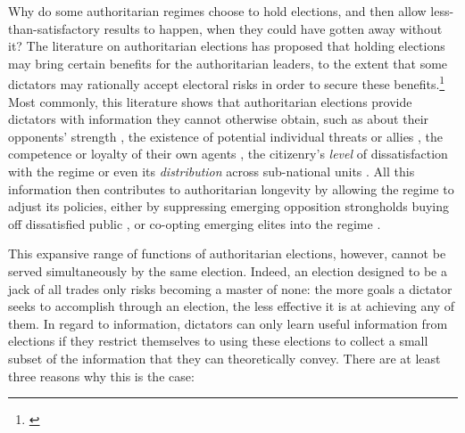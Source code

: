 \documentclass[12pt]{article}
\newcommand{\1}{\mathbbm{1}}
\begin{document}
Why do some authoritarian regimes choose to hold elections, and then allow less-than-satisfactory results to happen, when they could have gotten away without it? The literature on authoritarian elections has proposed that holding elections may bring certain benefits for the authoritarian leaders, to the extent that some dictators may rationally accept electoral risks in order to secure these benefits.\footnote{\cite[See][for some of the most seminal works in this literature]{Geddes2005, LustOkar2006, AR2005, Magaloni2006, Blaydes2008, Miller2015, Cox2009}} Most commonly, this literature shows that authoritarian elections provide dictators with information they cannot otherwise obtain, such as about their opponents' strength \citep{Geddes2005}, the existence of potential individual threats or allies \citep{LustOkar2005}, the competence or loyalty of their own agents \citep{Magaloni2006, Blaydes2008, Myagkov2009, RundlettSvolik2016}, the citizenry's \textit{level} of dissatisfaction with the regime \citep{Miller2015} or even its \textit{distribution} across sub-national units \citep{Magaloni2006, Blaydes2008, Reed2001}. All this information then contributes to authoritarian longevity by allowing the regime to adjust its policies, either by suppressing emerging opposition strongholds \citep{Magaloni2006, Blaydes2008} buying off dissatisfied public \citep{Reed2001, Miller2015, Magaloni2006}, or co-opting emerging elites into the regime \citep{LustOkar2005}.

This expansive range of functions of authoritarian elections, however, cannot be served simultaneously by the same election. Indeed, an election designed to be a jack of all trades only risks becoming a master of none: the more goals a dictator seeks to accomplish through an election, the less effective it is at achieving any of them. In regard to information, dictators can only learn useful information from elections if they restrict themselves to using these elections to collect a small subset of the information that they can theoretically convey. There are at least three reasons why this is the case:
\end{document}
